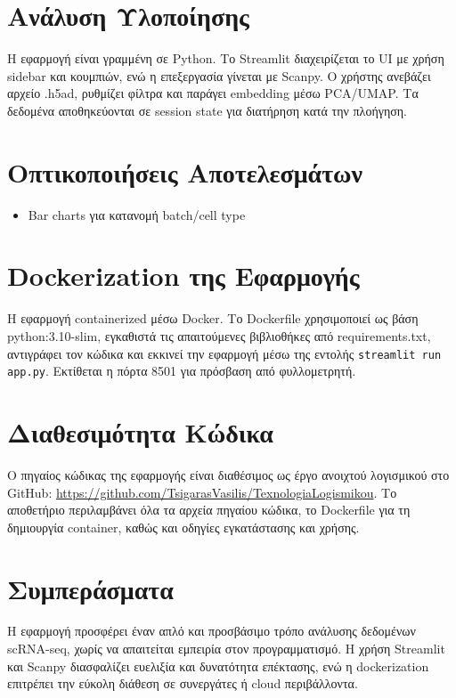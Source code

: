 \documentclass[a4paper,10pt]{article}
\begin{document}
\section{Ανάλυση Υλοποίησης}
Η εφαρμογή είναι γραμμένη σε Python. Το Streamlit διαχειρίζεται το UI με χρήση sidebar και κουμπιών, ενώ η επεξεργασία γίνεται με Scanpy. Ο χρήστης ανεβάζει αρχείο .h5ad, ρυθμίζει φίλτρα και παράγει embedding μέσω PCA/UMAP. Τα δεδομένα αποθηκεύονται σε session state για διατήρηση κατά την πλοήγηση.

\section{Οπτικοποιήσεις Αποτελεσμάτων}

\begin{itemize}
  \item Bar charts για κατανομή batch/cell type
\end{itemize}

\section{Dockerization της Εφαρμογής}

Η εφαρμογή containerized μέσω Docker. Το Dockerfile χρησιμοποιεί ως βάση python:3.10-slim, εγκαθιστά τις απαιτούμενες βιβλιοθήκες από requirements.txt, αντιγράφει τον κώδικα και εκκινεί την εφαρμογή μέσω της εντολής \texttt{streamlit run app.py}. Εκτίθεται η πόρτα 8501 για πρόσβαση από φυλλομετρητή.

\section{Διαθεσιμότητα Κώδικα}
Ο πηγαίος κώδικας της εφαρμογής είναι διαθέσιμος ως έργο ανοιχτού λογισμικού στο GitHub: \url{https://github.com/TsigarasVasilis/TexnologiaLogismikou}. Το αποθετήριο περιλαμβάνει όλα τα αρχεία πηγαίου κώδικα, το Dockerfile για τη δημιουργία container, καθώς και οδηγίες εγκατάστασης και χρήσης.

\section{Συμπεράσματα}
Η εφαρμογή προσφέρει έναν απλό και προσβάσιμο τρόπο ανάλυσης δεδομένων scRNA-seq, χωρίς να απαιτείται εμπειρία στον προγραμματισμό. Η χρήση Streamlit και Scanpy διασφαλίζει ευελιξία και δυνατότητα επέκτασης, ενώ η dockerization επιτρέπει την εύκολη διάθεση σε συνεργάτες ή cloud περιβάλλοντα.
\end{document}
